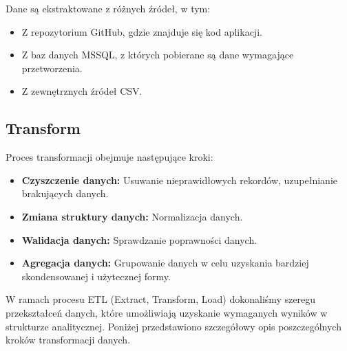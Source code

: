\documentclass[12pt]{article}
\begin{document}
Dane są ekstraktowane z różnych źródeł, w tym:
\begin{itemize}
    \item Z repozytorium GitHub, gdzie znajduje się kod aplikacji.
    \item Z baz danych MSSQL, z których pobierane są dane wymagające przetworzenia.
    \item Z zewnętrznych źródeł CSV.
\end{itemize}

\subsection{Transform}

Proces transformacji obejmuje następujące kroki:
\begin{itemize}
    \item \textbf{Czyszczenie danych:} Usuwanie nieprawidłowych rekordów, uzupełnianie brakujących danych.
    \item \textbf{Zmiana struktury danych:} Normalizacja danych.
    \item \textbf{Walidacja danych:} Sprawdzanie poprawności danych.
    \item \textbf{Agregacja danych:} Grupowanie danych w celu uzyskania bardziej skondensowanej i użytecznej formy.
\end{itemize}

W ramach procesu ETL (Extract, Transform, Load) dokonaliśmy szeregu przekształceń danych, które umożliwiają uzyskanie wymaganych wyników w strukturze analitycznej. Poniżej przedstawiono szczegółowy opis poszczególnych kroków transformacji danych.
\end{document}

